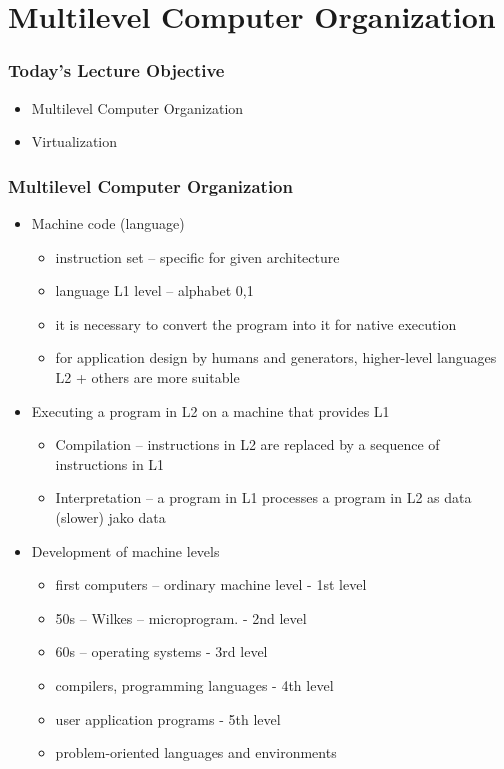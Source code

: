 \documentclass{beamer}
\subtitle{Lecture 13. Virtual Machines and Virtualization}
\author{Pavel Píša \phantom{xxxxxxxxx} Petr Štěpán \\ \small\texttt{pisa@fel.cvut.cz}\phantom{xxxx}\small\texttt{stepan@fel.cvut.cz}}
\begin{document}
\maketitle

\section{Multilevel Computer Organization}

\begin{frame}
\frametitle{Today's Lecture Objective}

\begin{itemize}
 \item Multilevel Computer Organization
 \item Virtualization
\end{itemize}
\end{frame}

\begin{frame}
\frametitle{Multilevel Computer Organization}

\begin{itemize}
 \item Machine code (language)
 \begin{itemize}
  \item instruction set -- specific for given architecture
  \item language L1 level -- alphabet {0,1}
  \item it is necessary to convert the program into it for native execution
  \item for application design by humans and generators, higher-level languages ​​L2 + others are more suitable
 \end{itemize}
 \item Executing a program in L2 on a machine that provides L1
 \begin{itemize}
  \item Compilation -- instructions in L2 are replaced by a sequence of instructions in L1
  \item Interpretation -- a program in L1 processes a program in L2 as data (slower) jako data
 \end{itemize}
 \item Development of machine levels
 \begin{itemize}
  \item first computers -- ordinary machine level - 1st level
  \item 50s -- Wilkes -- microprogram. - 2nd level
  \item 60s -- operating systems - 3rd level
  \item compilers, programming languages ​​- 4th level
  \item user application programs - 5th level
  \item problem-oriented languages ​​and environments
 \end{itemize}
\end{itemize}

\end{frame}
\end{document}
